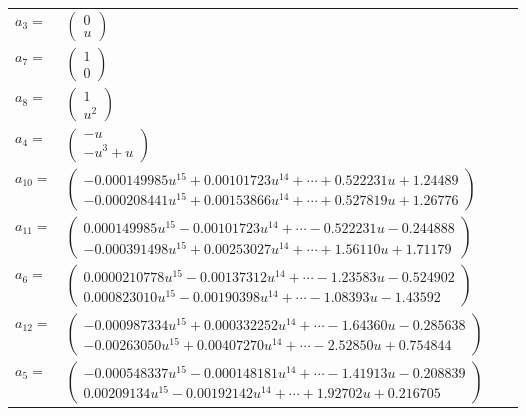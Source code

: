 \documentclass[1p]{elsarticle_modified}
\theoremstyle{definition}
\begin{document}
\begin{tabular}{m{7pt} m{180pt} m{7pt} m{180pt} }
\flushright $a_{3}=$&$\begin{pmatrix}0\\u\end{pmatrix}$ \\
\flushright $a_{7}=$&$\begin{pmatrix}1\\0\end{pmatrix}$ \\
\flushright $a_{8}=$&$\begin{pmatrix}1\\u^2\end{pmatrix}$ \\
\flushright $a_{4}=$&$\begin{pmatrix}- u\\- u^3+u\end{pmatrix}$ \\
\flushright $a_{10}=$&$\begin{pmatrix}-0.000149985 u^{15}+0.00101723 u^{14}+\cdots+0.522231 u+1.24489\\-0.000208441 u^{15}+0.00153866 u^{14}+\cdots+0.527819 u+1.26776\end{pmatrix}$ \\
\flushright $a_{11}=$&$\begin{pmatrix}0.000149985 u^{15}-0.00101723 u^{14}+\cdots-0.522231 u-0.244888\\-0.000391498 u^{15}+0.00253027 u^{14}+\cdots+1.56110 u+1.71179\end{pmatrix}$ \\
\flushright $a_{6}=$&$\begin{pmatrix}0.0000210778 u^{15}-0.00137312 u^{14}+\cdots-1.23583 u-0.524902\\0.000823010 u^{15}-0.00190398 u^{14}+\cdots-1.08393 u-1.43592\end{pmatrix}$ \\
\flushright $a_{12}=$&$\begin{pmatrix}-0.000987334 u^{15}+0.000332252 u^{14}+\cdots-1.64360 u-0.285638\\-0.00263050 u^{15}+0.00407270 u^{14}+\cdots-2.52850 u+0.754844\end{pmatrix}$ \\
\flushright $a_{5}=$&$\begin{pmatrix}-0.000548337 u^{15}-0.000148181 u^{14}+\cdots-1.41913 u-0.208839\\0.00209134 u^{15}-0.00192142 u^{14}+\cdots+1.92702 u+0.216705\end{pmatrix}$ \\

\end{tabular}
\end{document}
